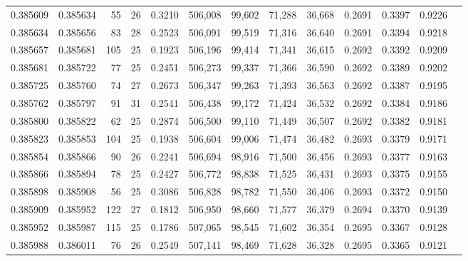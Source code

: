 \begin{tabular}{rrrrrrrrrrrrr}
0.385609 & 0.385634 &    55 &  26 &                                     0.3210 & 506,008 &  99,602 &  71,288 &  36,668 & 0.2691 & 0.3397 & 0.9226 \\
0.385634 & 0.385656 &    83 &  28 &                                     0.2523 & 506,091 &  99,519 &  71,316 &  36,640 & 0.2691 & 0.3394 & 0.9218 \\
0.385657 & 0.385681 &   105 &  25 &                                     0.1923 & 506,196 &  99,414 &  71,341 &  36,615 & 0.2692 & 0.3392 & 0.9209 \\
0.385681 & 0.385722 &    77 &  25 &                                     0.2451 & 506,273 &  99,337 &  71,366 &  36,590 & 0.2692 & 0.3389 & 0.9202 \\
0.385725 & 0.385760 &    74 &  27 &                                     0.2673 & 506,347 &  99,263 &  71,393 &  36,563 & 0.2692 & 0.3387 & 0.9195 \\
0.385762 & 0.385797 &    91 &  31 &                                     0.2541 & 506,438 &  99,172 &  71,424 &  36,532 & 0.2692 & 0.3384 & 0.9186 \\
0.385800 & 0.385822 &    62 &  25 &                                     0.2874 & 506,500 &  99,110 &  71,449 &  36,507 & 0.2692 & 0.3382 & 0.9181 \\
0.385823 & 0.385853 &   104 &  25 &                                     0.1938 & 506,604 &  99,006 &  71,474 &  36,482 & 0.2693 & 0.3379 & 0.9171 \\
0.385854 & 0.385866 &    90 &  26 &                                     0.2241 & 506,694 &  98,916 &  71,500 &  36,456 & 0.2693 & 0.3377 & 0.9163 \\
0.385866 & 0.385894 &    78 &  25 &                                     0.2427 & 506,772 &  98,838 &  71,525 &  36,431 & 0.2693 & 0.3375 & 0.9155 \\
0.385898 & 0.385908 &    56 &  25 &                                     0.3086 & 506,828 &  98,782 &  71,550 &  36,406 & 0.2693 & 0.3372 & 0.9150 \\
0.385909 & 0.385952 &   122 &  27 &                                     0.1812 & 506,950 &  98,660 &  71,577 &  36,379 & 0.2694 & 0.3370 & 0.9139 \\
0.385952 & 0.385987 &   115 &  25 &                                     0.1786 & 507,065 &  98,545 &  71,602 &  36,354 & 0.2695 & 0.3367 & 0.9128 \\
0.385988 & 0.386011 &    76 &  26 &                                     0.2549 & 507,141 &  98,469 &  71,628 &  36,328 & 0.2695 & 0.3365 & 0.9121 \\

\end{tabular}
